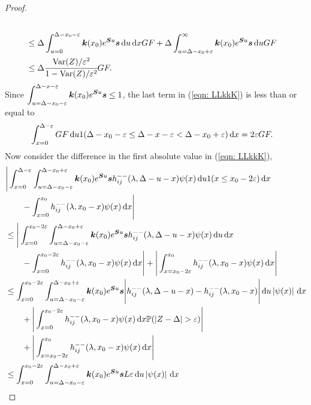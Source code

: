 \begin{proof}
\begin{align}
		\\&\leq\Delta\int_{u=0}^{\Delta-x_0-\varepsilon} \boldsymbol k(x_0)e^{\boldsymbol Su}\boldsymbol s  \, \mathrm{d} u \, \mathrm{d} xGF 
		+ \Delta \int_{u=\Delta-x_0+\varepsilon}^{\infty} \boldsymbol k(x_0)e^{\boldsymbol Su}\boldsymbol s  \, \mathrm{d} u GF \nonumber
		\\&\leq \Delta \cfrac{\mathrm{Var}(Z)/\varepsilon^2}{1-\mathrm{Var}(Z)/\varepsilon^2}GF. \label{eqn:aaAAAAd}
	\end{align}
	Since \(\displaystyle \int_{u=\Delta-x_0-\varepsilon}^{\Delta-x-\varepsilon} \boldsymbol k(x_0)e^{\boldsymbol Su}\boldsymbol s \leq 1\), the last term in (\ref{eqn: LLkkK}) is less than or equal to 
	\begin{align}
		&\int_{x=0}^{\Delta-\varepsilon}GF \, \mathrm{d} u 
		 1(\Delta-x_0-\varepsilon\leq \Delta - x -\varepsilon < \Delta-x_0+\varepsilon)\, \mathrm{d} x =2\varepsilon GF. \label{eqn:Qwe}
	\end{align}
	Now consider the difference in the first absolute value in (\ref{eqn: LLkkK}),
	\begin{align}
		&\Bigg|\int_{x=0}^{\Delta-\varepsilon}\int_{u=\Delta-x_0-\varepsilon}^{\Delta-x_0+\varepsilon} \bs k(x_0)e^{\bs Su}\bs s h_{ij}^{--}(\lambda, \Delta - u - x) \psi(x) \wrt u 1(x\leq x_0-2\varepsilon) \wrt x \nonumber
		\\&{}\qquad {} - \int_{x=0}^{x_0} h_{ij}^{--}(\lambda, x_0 - x)\psi(x)\wrt x \Bigg|\nonumber
		\\&\leq \Bigg|\int_{x=0}^{ x_0-2\varepsilon }\int_{u=\Delta-x_0-\varepsilon}^{\Delta-x_0+\varepsilon} \bs k(x_0)e^{\bs Su}\bs s h_{ij}^{--}(\lambda, \Delta - u - x) \psi(x) \wrt u  \wrt x \nonumber
		\\&{}\qquad {} - \int_{x=0}^{x_0-2\varepsilon} h_{ij}^{--}(\lambda, x_0 - x)\psi(x)\wrt x\Bigg| + \Bigg| \int_{x=x_0-2\varepsilon}^{x_0} h_{ij}^{--}(\lambda, x_0 - x)\psi(x)\wrt x\Bigg| \nonumber
		\\&\leq  \int_{x=0}^{ x_0-2\varepsilon }\int_{u=\Delta-x_0-\varepsilon}^{\Delta-x_0+\varepsilon} \bs k(x_0)e^{\bs Su}\bs s \Bigg| h_{ij}^{--}(\lambda, \Delta - u - x) - h_{ij}^{--}(\lambda, x_0 - x) \Bigg| \wrt u \left|\psi(x)\right| \wrt x  \nonumber
		\\&{}\qquad {} + \Bigg| \int_{x=0}^{x_0-2\varepsilon} h_{ij}^{--}(\lambda, x_0 - x)\psi(x) \wrt x \mathbb P(|Z-\Delta|>\varepsilon)\Bigg| \nonumber 
		\\&\qquad{} + \Bigg|\int_{x=x_0-2\varepsilon}^{x_0} h_{ij}^{--}(\lambda, x_0 - x)\psi(x)\wrt x \Bigg| \nonumber
		\\&\leq \int_{x=0}^{ x_0-2\varepsilon }\int_{u=\Delta-x_0-\varepsilon}^{\Delta-x_0+\varepsilon} \bs k(x_0)e^{\bs Su}\bs s L\varepsilon  \wrt u \left|\psi(x)\right| \wrt x \nonumber

\end{align}
\end{proof}

